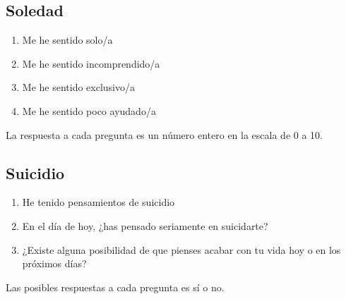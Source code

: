        \subsection{Soledad}
            \label{cuestionarios:soledad_noche}
            \begin{enumerate}
                \item Me he sentido solo/a
                \item Me he sentido incomprendido/a
                \item Me he sentido exclusivo/a
                \item Me he sentido poco ayudado/a
            \end{enumerate}
            La respuesta a cada pregunta es un número entero en la escala de 0 a 10.

        \subsection{Suicidio}
            \label{cuestionarios:suicidio_noche}
            \begin{enumerate}
                \item He tenido pensamientos de suicidio
                \item En el día de hoy, ¿has pensado seriamente en suicidarte?
                \item ¿Existe alguna posibilidad de que pienses acabar con tu vida hoy o en los próximos días?
            \end{enumerate}
            Las posibles respuestas a cada pregunta es sí o no.

